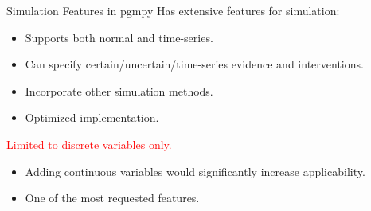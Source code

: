 \documentclass{beamer}
\begin{document}
\begin{frame}{Simulation Features in pgmpy}
	Has extensive features for simulation:
	\begin{itemize}
		\item Supports both normal and time-series.
		\item Can specify certain/uncertain/time-series evidence and interventions.
		\item Incorporate other simulation methods.
		\item Optimized implementation.
	\end{itemize}


	\vspace{2em}
	\centerline{\textcolor{red}{Limited to discrete variables only.}}
	\vspace{2em}
	\begin{itemize}
		\item Adding continuous variables would significantly increase applicability.
		\item One of the most requested features.
	\end{itemize}



\end{frame}
\end{document}
